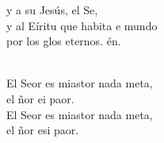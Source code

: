 \documentclass[12pt]{article}
\begin{document}
\begin{multicols*}{2}
\begin{cancion}
	y a su  Jesús, el Se,\\
	y al Eíritu que habita e mundo\\
	por los glos eternos. én.\\\jump\\
	\begin{chorus}%
	El Seor es miastor nada meta,\\
	el ñor ei paor.\\
	El Seor es miastor nada meta,\\
	el ñor esi paor.\\
	\end{chorus}%
	\jump\\
\end{cancion}%


\end{multicols*}
\end{document}
